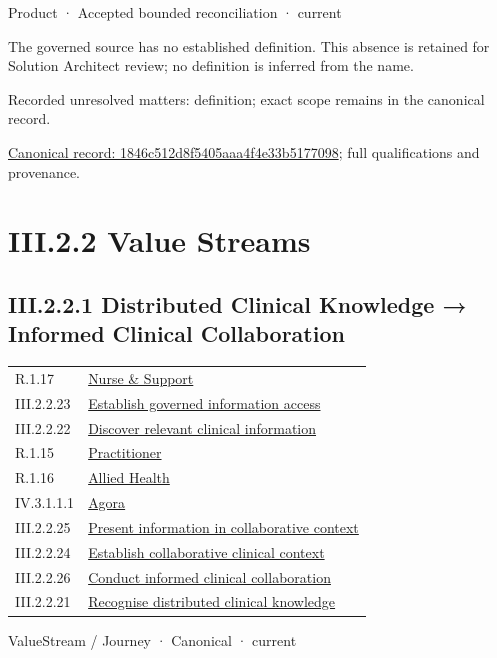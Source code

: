 \label{element:1846c512d8f5405aaa4f4e33b5177098}
{\small Product · Accepted bounded reconciliation · current}\par

The governed source has no established definition. This absence is retained for Solution Architect review; no definition is inferred from the name.


{\small Recorded unresolved matters: definition; exact scope remains in the canonical record.}\par
{\footnotesize \href{../../../../../../../continuum/business/product/1846c512d8f5405aaa4f4e33b5177098.md}{Canonical record: 1846c512d8f5405aaa4f4e33b5177098}; full qualifications and provenance.}\par
\section*{III.2.2 Value Streams}
\label{navigation:III.2.2}

\subsection*{III.2.2.1 Distributed Clinical Knowledge → Informed Clinical Collaboration}
\label{navigation:III.2.2.1}

\begin{longtable}{p{.22\linewidth}p{.73\linewidth}}
R.1.17 & \hyperref[element:2498df8f930747fba52ef1a77b710156]{Nurse \& Support} \\
III.2.2.23 & \hyperref[element:26719186d6444b5b80029fbf13ae7d06]{Establish governed information access} \\
III.2.2.22 & \hyperref[element:413213f085b44715a309f39b55ee3ee6]{Discover relevant clinical information} \\
R.1.15 & \hyperref[element:49480591b4554983aaa82a79c1568bf3]{Practitioner} \\
R.1.16 & \hyperref[element:a5880a0af54c4797818caba31b813d19]{Allied Health} \\
IV.3.1.1.1 & \hyperref[element:d1c4053e68384080b8eb79d2008632ba]{Agora} \\
III.2.2.25 & \hyperref[element:e0a57481d1d343d48abc3357053576bb]{Present information in collaborative context} \\
III.2.2.24 & \hyperref[element:e453905e7aef4db2aba07de5efc932bc]{Establish collaborative clinical context} \\
III.2.2.26 & \hyperref[element:e53b13570f1945829b753d8d7b427fda]{Conduct informed clinical collaboration} \\
III.2.2.21 & \hyperref[element:fc1b52968e944710b41b2a7c3fa53e5b]{Recognise distributed clinical knowledge} \\
\end{longtable}
\label{element:3ba98c0c1170458f8c02fa76694fee67}
{\small ValueStream / Journey · Canonical · current}\par

